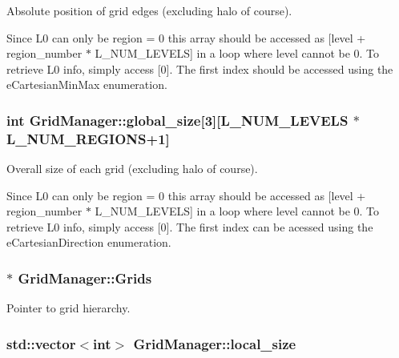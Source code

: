 Absolute position of grid edges (excluding halo of course). 

Since L0 can only be region = 0 this array should be accessed as \mbox{[}level + region\+\_\+number $\ast$ L\+\_\+\+N\+U\+M\+\_\+\+L\+E\+V\+E\+LS\mbox{]} in a loop where level cannot be 0. To retrieve L0 info, simply access \mbox{[}0\mbox{]}. The first index should be accessed using the e\+Cartesian\+Min\+Max enumeration. 
\subsubsection[{\texorpdfstring{global\+\_\+size}{global_size}}]{\setlength{\rightskip}{0pt plus 5cm}int Grid\+Manager\+::global\+\_\+size\mbox{[}3\mbox{]}\mbox{[}{\bf L\+\_\+\+N\+U\+M\+\_\+\+L\+E\+V\+E\+LS} $\ast${\bf L\+\_\+\+N\+U\+M\+\_\+\+R\+E\+G\+I\+O\+NS}+1\mbox{]}\hspace{0.3cm}{\ttfamily [protected]}}\hypertarget{class_grid_manager_a2b0bb9ddb852502444c8ea80ece661cd}{}\label{class_grid_manager_a2b0bb9ddb852502444c8ea80ece661cd}


Overall size of each grid (excluding halo of course). 

Since L0 can only be region = 0 this array should be accessed as \mbox{[}level + region\+\_\+number $\ast$ L\+\_\+\+N\+U\+M\+\_\+\+L\+E\+V\+E\+LS\mbox{]} in a loop where level cannot be 0. To retrieve L0 info, simply access \mbox{[}0\mbox{]}. The first index can be acessed using the e\+Cartesian\+Direction enumeration. 
\subsubsection[{\texorpdfstring{Grids}{Grids}}]{$\ast$ Grid\+Manager\+::\+Grids}\hypertarget{class_grid_manager_a434defbaec1448b17cc62cc8b4e5ba11}{}\label{class_grid_manager_a434defbaec1448b17cc62cc8b4e5ba11}


Pointer to grid hierarchy. 

\subsubsection[{\texorpdfstring{local\+\_\+size}{local_size}}]{\setlength{\rightskip}{0pt plus 5cm}std\+::vector$<$int$>$ Grid\+Manager\+::local\+\_\+size\hspace{0.3cm}{\ttfamily [protected]}}\hypertarget{class_grid_manager_a2994b896500f533e6f099c9d0cef027e}{}\label{class_grid_manager_a2994b896500f533e6f099c9d0cef027e}


